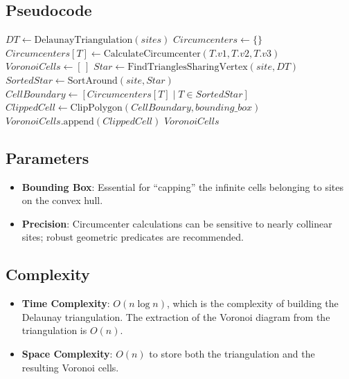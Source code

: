

\subsection{Pseudocode}

\begin{algorithm}[htbp]
\caption{Voronoi Diagram via Delaunay Dual}
\label{alg:voronoi}
\begin{algorithmic}[1]
  \State $DT \gets \text{DelaunayTriangulation}(sites)$
  \State $Circumcenters \gets \{\}$
    \State $Circumcenters[T] \gets \text{CalculateCircumcenter}(T.v1, T.v2, T.v3)$
  \EndFor
  \State $VoronoiCells \gets [\,]$
    \State $Star \gets \text{FindTrianglesSharingVertex}(site, DT)$
    \State $SortedStar \gets \text{SortAround}(site, Star)$
    \State $CellBoundary \gets [Circumcenters[T] \mid T \in SortedStar]$
    \State $ClippedCell \gets \text{ClipPolygon}(CellBoundary, bounding\_box)$
    \State $VoronoiCells.\text{append}(ClippedCell)$
  \EndFor
  \State \Return $VoronoiCells$
\EndFunction
\end{algorithmic}
\end{algorithm}

\subsection{Parameters}

\begin{itemize}
\item \textbf{Bounding Box}: Essential for ``capping'' the infinite cells belonging to sites on the convex hull.
\item \textbf{Precision}: Circumcenter calculations can be sensitive to nearly collinear sites; robust geometric predicates are recommended.
\end{itemize}

\subsection{Complexity}

\begin{itemize}
\item \textbf{Time Complexity}: $O(n \log n)$, which is the complexity of building the Delaunay triangulation. The extraction of the Voronoi diagram from the triangulation is $O(n)$.
\item \textbf{Space Complexity}: $O(n)$ to store both the triangulation and the resulting Voronoi cells.
\end{itemize}

